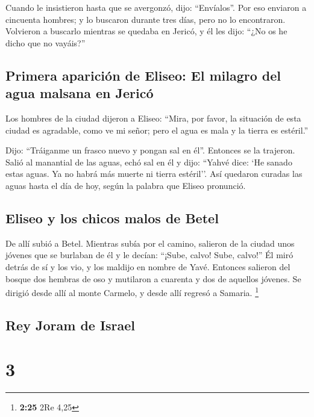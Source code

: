  Cuando le insistieron hasta que se avergonzó, dijo:
``Envíalos''. Por eso enviaron a cincuenta hombres; y lo buscaron
durante tres días, pero no lo encontraron.  Volvieron a
buscarlo mientras se quedaba en Jericó, y él les dijo: ``¿No os he dicho
que no vayáis?''

\hypertarget{primera-apariciuxf3n-de-eliseo-el-milagro-del-agua-malsana-en-jericuxf3}{%
\subsection{Primera aparición de Eliseo: El milagro del agua malsana en
Jericó}\label{primera-apariciuxf3n-de-eliseo-el-milagro-del-agua-malsana-en-jericuxf3}}

 Los hombres de la ciudad dijeron a Eliseo: ``Mira, por
favor, la situación de esta ciudad es agradable, como ve mi señor; pero
el agua es mala y la tierra es estéril.''

 Dijo: ``Tráiganme un frasco nuevo y pongan sal en él''.
Entonces se la trajeron.  Salió al manantial de las
aguas, echó sal en él y dijo: ``Yahvé dice: `He sanado estas aguas. Ya
no habrá más muerte ni tierra estéril''.  Así quedaron
curadas las aguas hasta el día de hoy, según la palabra que Eliseo
pronunció.

\hypertarget{eliseo-y-los-chicos-malos-de-betel}{%
\subsection{Eliseo y los chicos malos de
Betel}\label{eliseo-y-los-chicos-malos-de-betel}}

 De allí subió a Betel. Mientras subía por el camino,
salieron de la ciudad unos jóvenes que se burlaban de él y le decían:
``¡Sube, calvo! Sube, calvo!''  Él miró detrás de sí y
los vio, y los maldijo en nombre de Yavé. Entonces salieron del bosque
dos hembras de oso y mutilaron a cuarenta y dos de aquellos jóvenes.
 Se dirigió desde allí al monte Carmelo, y desde allí
regresó a Samaria. \footnote{\textbf{2:25} 2Re 4,25}

\hypertarget{rey-joram-de-israel}{%
\subsection{Rey Joram de Israel}\label{rey-joram-de-israel}}

\hypertarget{section-2}{%
\section{3}\label{section-2}}

